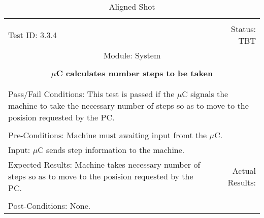\documentclass[titlepage]{article}
\begin{document}
\begin{center}%
\begin{table}
\begin{tabular}{|l r|}\hline&\\[-2mm]
	Test ID: 3.3.4	&Status: TBT\\[-3mm]
	\multicolumn{2}{|c|}{Module: System}\\&\\
	\multicolumn{2}{|c|}{\textbf{\large{$\mu$C calculates number steps to be taken}}}\\&\\\hline&\\[-3mm]
	\multicolumn{2}{|p{\textwidth}|}{Pass/Fail Conditions: This test is passed if the $\mu$C signals the machine to take the necessary number of steps so as to move to the posision requested by the PC.}\\[1mm]\hline&\\[-3mm]
	\multicolumn{2}{|p{\textwidth}|}{Pre-Conditions: Machine must awaiting input fromt the $\mu$C.}\\[4mm]
	\multicolumn{2}{|p{\textwidth}|}{Input: $\mu$C sends step information to the machine.}\\[2mm]\hline
	\multicolumn{1}{|p{0.49\textwidth}}{Expected Results: Machine takes necessary number of steps so as to move to the posision requested by the PC.}	&\multicolumn{1}{|p{0.45\textwidth}|}{Actual Results: }\\\hline&\\[-3mm]
	\multicolumn{2}{|p{\textwidth}|}{Post-Conditions: None.}\\\hline
\end{tabular}
\caption{Aligned Shot}
\end{table}
\end{center}
\end{document}
